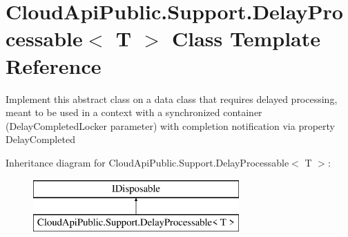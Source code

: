 \hypertarget{class_cloud_api_public_1_1_support_1_1_delay_processable_3_01_t_01_4}{\section{Cloud\-Api\-Public.\-Support.\-Delay\-Processable$<$ T $>$ Class Template Reference}
\label{class_cloud_api_public_1_1_support_1_1_delay_processable_3_01_t_01_4}
}


Implement this abstract class on a data class that requires delayed processing, meant to be used in a context with a synchronized container (Delay\-Completed\-Locker parameter) with completion notification via property Delay\-Completed  


Inheritance diagram for Cloud\-Api\-Public.\-Support.\-Delay\-Processable$<$ T $>$\-:\begin{figure}[H]
\begin{center}
\leavevmode
\includegraphics[height=2.000000cm]{class_cloud_api_public_1_1_support_1_1_delay_processable_3_01_t_01_4}
\end{center}
\end{figure}
